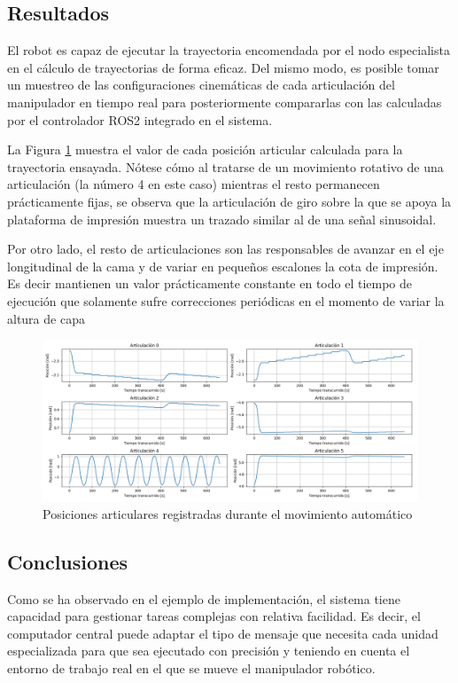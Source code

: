 \subsection{Resultados}
El robot es capaz de ejecutar la trayectoria encomendada por el nodo especialista en el cálculo de trayectorias de forma eficaz. Del mismo modo, es posible tomar un muestreo de las configuraciones cinemáticas de cada articulación del manipulador en tiempo real para posteriormente compararlas con las calculadas por el controlador ROS2 integrado en el sistema.

La Figura \ref{fig:ejemplo_muestreo} muestra el valor de cada posición articular calculada para la trayectoria  ensayada. Nótese cómo al tratarse de un movimiento rotativo de una articulación (la número 4 en este caso) mientras el resto permanecen prácticamente fijas, se observa que la articulación de giro sobre la que se apoya la plataforma de impresión muestra un trazado similar al de una señal sinusoidal. 

Por otro lado, el resto de articulaciones son las responsables de avanzar en el eje longitudinal de la cama y de variar en pequeños escalones la cota de impresión. Es decir mantienen un valor prácticamente constante en todo el tiempo de ejecución que solamente sufre correcciones periódicas en el momento de variar la altura de capa

\begin{figure}[h!]
    \centering
    \includegraphics[scale=0.30]{figuras/ejemplo_muestreo.png}
    \caption{Posiciones articulares registradas durante el movimiento automático}
    \label{fig:ejemplo_muestreo}
\end{figure}

\subsection{Conclusiones}
Como se ha observado en el ejemplo de implementación, el sistema tiene capacidad para gestionar tareas complejas con relativa facilidad. Es decir, el computador central puede adaptar el tipo de mensaje que necesita cada unidad especializada para que sea ejecutado con precisión y teniendo en cuenta el entorno de trabajo real en el que se mueve el manipulador robótico.

